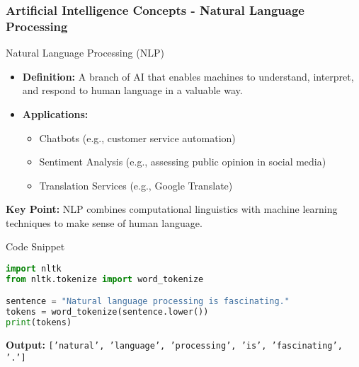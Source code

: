 \documentclass[aspectratio=169]{beamer}
\begin{document}
\begin{frame}[fragile]
    \frametitle{Artificial Intelligence Concepts - Natural Language Processing}
    \begin{block}{Natural Language Processing (NLP)}
        \begin{itemize}
            \item \textbf{Definition:} A branch of AI that enables machines to understand, interpret, and respond to human language in a valuable way.
            \item \textbf{Applications:}
            \begin{itemize}
                \item Chatbots (e.g., customer service automation)
                \item Sentiment Analysis (e.g., assessing public opinion in social media)
                \item Translation Services (e.g., Google Translate)
            \end{itemize}
        \end{itemize}
        
        \textbf{Key Point:} NLP combines computational linguistics with machine learning techniques to make sense of human language.
        
        \begin{block}{Code Snippet}
            \begin{lstlisting}[language=Python]
import nltk
from nltk.tokenize import word_tokenize

sentence = "Natural language processing is fascinating."
tokens = word_tokenize(sentence.lower())
print(tokens)
            \end{lstlisting}
            \textbf{Output:} \texttt{['natural', 'language', 'processing', 'is', 'fascinating', '.']}
        \end{block}
    \end{block}
\end{frame}
\end{document}
